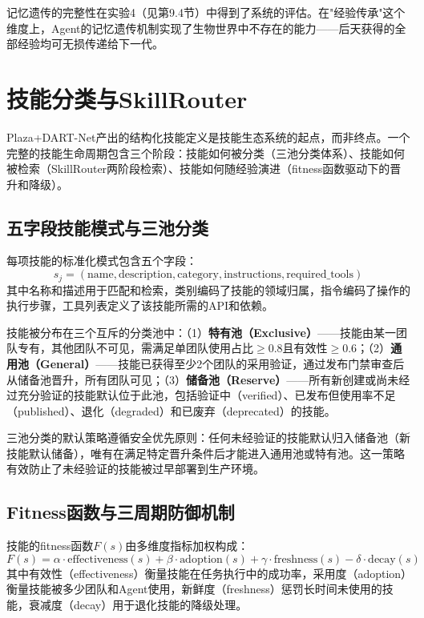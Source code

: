 \documentclass[12pt,a4paper]{ctexart}
\begin{document}
记忆遗传的完整性在实验4（见第9.4节）中得到了系统的评估。在"经验传承"这个维度上，Agent的记忆遗传机制实现了生物世界中不存在的能力——后天获得的全部经验均可无损传递给下一代。

\section{技能分类与SkillRouter}

Plaza+DART-Net产出的结构化技能定义是技能生态系统的起点，而非终点。一个完整的技能生命周期包含三个阶段：技能如何被分类（三池分类体系）、技能如何被检索（SkillRouter两阶段检索）、技能如何随经验演进（fitness函数驱动下的晋升和降级）。

\subsection{五字段技能模式与三池分类}

每项技能的标准化模式包含五个字段：
\begin{equation}
s_j = (\text{name}, \text{description}, \text{category}, \text{instructions}, \text{required\_tools})
\label{eq:skill_schema}
\end{equation}
其中名称和描述用于匹配和检索，类别编码了技能的领域归属，指令编码了操作的执行步骤，工具列表定义了该技能所需的API和依赖。

技能被分布在三个互斥的分类池中：（1）\textbf{特有池（Exclusive）}——技能由某一团队专有，其他团队不可见，需满足单团队使用占比$\geq 0.8$且有效性$\geq 0.6$；（2）\textbf{通用池（General）}——技能已获得至少2个团队的采用验证，通过发布门禁审查后从储备池晋升，所有团队可见；（3）\textbf{储备池（Reserve）}——所有新创建或尚未经过充分验证的技能默认位于此池，包括验证中（verified）、已发布但使用率不足（published）、退化（degraded）和已废弃（deprecated）的技能。

三池分类的默认策略遵循安全优先原则：任何未经验证的技能默认归入储备池（新技能默认储备），唯有在满足特定晋升条件后才能进入通用池或特有池。这一策略有效防止了未经验证的技能被过早部署到生产环境。

\subsection{Fitness函数与三周期防御机制}

技能的fitness函数$F(s)$由多维度指标加权构成：
\begin{equation}
F(s) = \alpha \cdot \text{effectiveness}(s) + \beta \cdot \text{adoption}(s) + \gamma \cdot \text{freshness}(s) - \delta \cdot \text{decay}(s)
\label{eq:fitness}
\end{equation}
其中有效性（effectiveness）衡量技能在任务执行中的成功率，采用度（adoption）衡量技能被多少团队和Agent使用，新鲜度（freshness）惩罚长时间未使用的技能，衰减度（decay）用于退化技能的降级处理。
\end{document}
